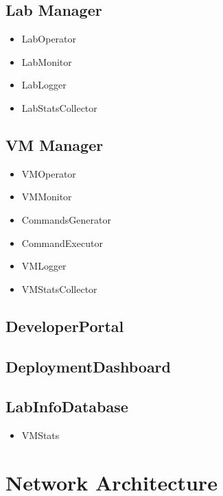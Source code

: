 \documentclass[11pt]{article}
\begin{document}
\subsection{Lab Manager}
\label{sec-4.1}


\begin{itemize}
\item LabOperator
\item LabMonitor
\item LabLogger
\item LabStatsCollector
\end{itemize}
\subsection{VM Manager}
\label{sec-4.2}


\begin{itemize}
\item VMOperator
\item VMMonitor
\item CommandsGenerator
\item CommandExecutor
\item VMLogger
\item VMStatsCollector
\end{itemize}
    
\subsection{DeveloperPortal}
\label{sec-4.3}

   
\subsection{DeploymentDashboard}
\label{sec-4.4}


\subsection{LabInfoDatabase}
\label{sec-4.5}

\begin{itemize}
\item VMStats
\end{itemize}
\subsection{}


\section{Network Architecture}
\label{sec-5}
\end{document}
